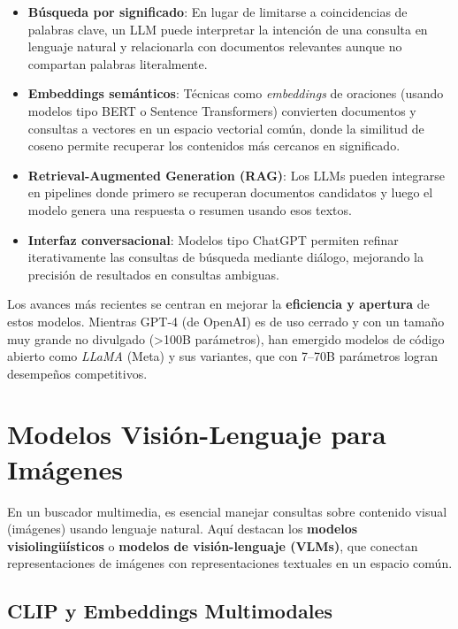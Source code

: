 \begin{itemize}
  \item \textbf{Búsqueda por significado}: En lugar de limitarse a coincidencias de palabras clave, un LLM puede interpretar la intención de una consulta en lenguaje natural y relacionarla con documentos relevantes aunque no compartan palabras literalmente.
  
  \item \textbf{Embeddings semánticos}: Técnicas como \emph{embeddings} de oraciones (usando modelos tipo BERT o Sentence Transformers) convierten documentos y consultas a vectores en un espacio vectorial común, donde la similitud de coseno permite recuperar los contenidos más cercanos en significado.
  
  \item \textbf{Retrieval-Augmented Generation (RAG)}: Los LLMs pueden integrarse en pipelines donde primero se recuperan documentos candidatos y luego el modelo genera una respuesta o resumen usando esos textos.
  
  \item \textbf{Interfaz conversacional}: Modelos tipo ChatGPT permiten refinar iterativamente las consultas de búsqueda mediante diálogo, mejorando la precisión de resultados en consultas ambiguas.
\end{itemize}

Los avances más recientes se centran en mejorar la \textbf{eficiencia y apertura} de estos modelos. Mientras GPT-4 (de OpenAI) es de uso cerrado y con un tamaño muy grande no divulgado (>100B parámetros), han emergido modelos de código abierto como \emph{LLaMA} (Meta) y sus variantes, que con 7--70B parámetros logran desempeños competitivos.

\section{Modelos Visión-Lenguaje para Imágenes}

En un buscador multimedia, es esencial manejar consultas sobre contenido visual (imágenes) usando lenguaje natural. Aquí destacan los \textbf{modelos visiolingüísticos} o \textbf{modelos de visión-lenguaje (VLMs)}, que conectan representaciones de imágenes con representaciones textuales en un espacio común.

\subsection{CLIP y Embeddings Multimodales}

